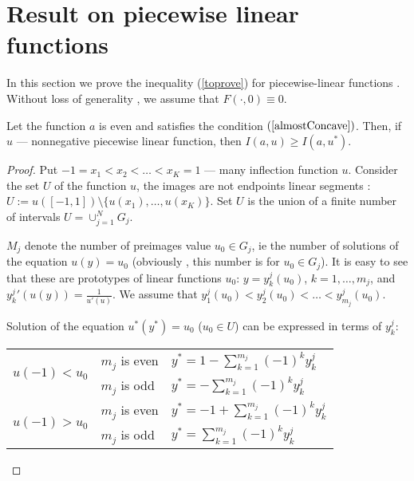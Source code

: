 \section{ Result on piecewise linear functions }

\rm
In this section we prove the inequality (\ref{toprove}) for piecewise-linear functions .
Without loss of generality , we assume that $F(\cdot, 0) \equiv 0$.

\begin{thm}
\label{linth}
Let the function $a$ is even and satisfies the condition $(\ref{almostConcave})$.
Then, if $u$ --- nonnegative piecewise linear function, then $I(a, u) \ge I(a, u^*)$.
\end{thm}

\begin{proof}
Put $-1 = x_1 < x_2 < \dots < x_K = 1$ --- many inflection function $u$.
Consider the set $U$ of the function $u$, the images are not endpoints
linear segments : $U := u( [-1, 1] ) \setminus \{ u(x_1), \dots, u(x_K) \}$.
Set $U$ is the union of a finite number of intervals $U = \cup_{j = 1}^N G_j$.

$ M_j $ denote the number of preimages value $u_0 \in G_j$,
ie the number of solutions of the equation $u(y) = u_0$
(obviously , this number is for $u_0 \in G_j$).
It is easy to see that these are prototypes of linear functions $u_0$:
$y = y_k^j(u_0)$, $k = 1, \dots, m_j$,
and $y_k^j{}'(u(y)) = \frac{1}{u'(u)}$.
We assume that $y_1^j(u_0) < y_2^j(u_0) < \dots < y_{m_j}^j(u_0)$.

Solution of the equation $u^*(y^*)=u_0$ ($u_0 \in U$) can be expressed in terms of $y_k^j$:

\begin{center}
\begin{tabular}{l|l|l} 
\multirow{2}{*}{$u(-1)<u_0$ \rule[-34pt]{0pt}{65pt}} & $m_j$ is even & $y^*=1-\sum\limits_{k=1}^{m_j} (-1)^k y_k^j$ \rule[-17pt]{0pt}{40pt} \\
                                                     & $m_j$ is odd  & $y^*=-\sum\limits_{k=1}^{m_j} (-1)^k y_k^j$ \rule[-17pt]{0pt}{40pt} \\ \hline
\multirow{2}{*}{$u(-1)>u_0$ \rule[-34pt]{0pt}{65pt}} & $m_j$ is even & $y^*=-1+\sum\limits_{k=1}^{m_j} (-1)^k y_k^j$ \rule[-17pt]{0pt}{40pt} \\
                                                     & $m_j$ is odd  & $y^*=\sum\limits_{k=1}^{m_j} (-1)^k y_k^j$ \rule[-17pt]{0pt}{40pt} \\ 
\end{tabular}
\end{center}


\end{proof}
